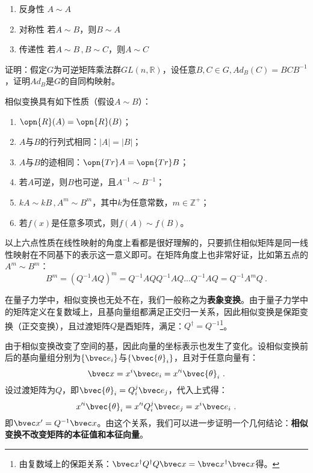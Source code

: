 \begin{enumerate}
\item 反身性 $A\sim A$ 
\item 对称性 若$A\sim B$，则$B\sim A$
\item 传递性 若$A\sim B\,,B\sim C$，则$A\sim C$
\end{enumerate}
\begin{exercise}{}
证明：假定$G$为可逆矩阵乘法群$GL(n,\mathbb R)$，设任意$B,C\in G, Ad_B(C)=BCB^{-1}$，证明$Ad_B$是$G$的自同构映射。
\end{exercise}

相似变换具有如下性质（假设$A\sim B$）：
\begin{enumerate}
\item $\opn{R}(A)=\opn{R}(B)$；
\item $A$与$B$的行列式相同：$|A|=|B|$；
\item $A$与$B$的迹相同：$\opn{Tr}A=\opn{Tr}B$；
\item 若$A$可逆，则$B$也可逆，且$A^{-1}\sim B^{-1}$；
\item $kA\sim kB\,,A^m\sim B^m$，其中$k$为任意常数，$m\in \mathbb Z^{+}$；
\item 若$f(x)$是任意多项式，则$f(A)\sim f(B)$。
\end{enumerate}
以上六点性质在线性映射的角度上看都是很好理解的，只要抓住相似矩阵是同一线性映射在不同基下的表示这一意义即可。在矩阵角度上也非常好证，比如第五点的$A^m\sim B^m$：\begin{equation}
B^m=(Q^{-1}AQ)^m=Q^{-1}AQQ^{-1}AQ...Q^{-1}AQ=Q^{-1}A^mQ~.
\end{equation}

在量子力学中，相似变换也无处不在，我们一般称之为\textbf{表象变换}。由于量子力学中的矩阵定义在复数域上，且基向量组都满足正交归一关系，因此相似变换是保距变换（正交变换），且过渡矩阵$Q$是酉矩阵，满足：$Q^{\dagger}=Q^{-1}$\footnote{由复数域上的保距关系：$\bvec x^{\dagger}Q^{\dagger}Q\bvec x=\bvec x^{\dagger}\bvec x$得。}。

由于相似变换改变了空间的基，因此向量的坐标表示也发生了变化。设相似变换前后的基向量组分别为$\{\bvec e_i\}$与$\{\bvec {\theta}_i\}$，且对于任意向量有：
\begin{equation}
\bvec x=x^i\bvec e_i=x'^i\bvec {\theta}_i~.
\end{equation}
设过渡矩阵为$Q$，即$\bvec{\theta}_i=Q^j_i\bvec e_j$，代入上式得：
\begin{equation}
x'^i\bvec {\theta}_i=x'^iQ^j_i\bvec e_j=x^i\bvec e_i~.
\end{equation}
即$\bvec x'=Q^{-1}\bvec x$。由这个关系，我们可以进一步证明一个几何结论：\textbf{相似变换不改变矩阵的本征值和本征向量}。
